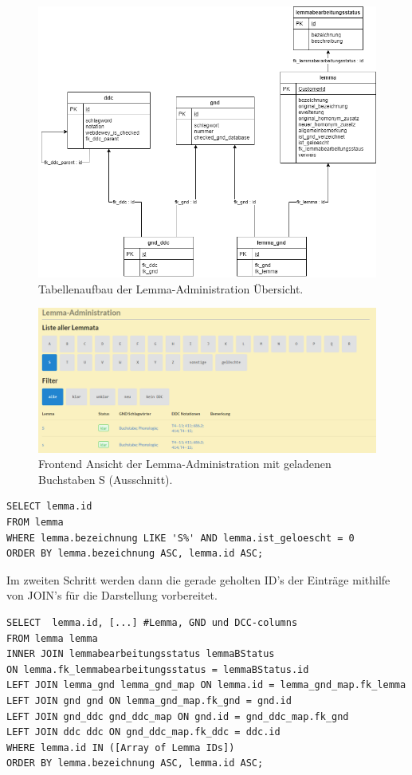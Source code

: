 \begin{figure}
	\centering
	\includegraphics[width=0.8\linewidth]{images/structure_lemmaadministration.png}
	\caption{Tabellenaufbau der Lemma-Administration Übersicht.}
	\label{img:lAdminStructure}
\end{figure}

\begin{figure}
	\centering
	\includegraphics[width=1\linewidth]{images/lemmaadministration_sample.PNG}
	\caption{Frontend Ansicht der Lemma-Administration mit geladenen Buchstaben S (Ausschnitt).}
	\label{img:lAdminSample}
\end{figure}

\lstset{language=SQL}
\begin{lstlisting}[frame=single] 
SELECT lemma.id
FROM lemma
WHERE lemma.bezeichnung LIKE 'S%' AND lemma.ist_geloescht = 0
ORDER BY lemma.bezeichnung ASC, lemma.id ASC;
\end{lstlisting}

Im zweiten Schritt werden dann die gerade geholten ID's der Einträge mithilfe von JOIN’s für die Darstellung vorbereitet.

\lstset{language=SQL}
\begin{lstlisting}[frame=single, label={lst:sqlQuery}] 
SELECT  lemma.id, [...] #Lemma, GND und DCC-columns        
FROM lemma lemma
INNER JOIN lemmabearbeitungsstatus lemmaBStatus
ON lemma.fk_lemmabearbeitungsstatus = lemmaBStatus.id
LEFT JOIN lemma_gnd lemma_gnd_map ON lemma.id = lemma_gnd_map.fk_lemma
LEFT JOIN gnd gnd ON lemma_gnd_map.fk_gnd = gnd.id
LEFT JOIN gnd_ddc gnd_ddc_map ON gnd.id = gnd_ddc_map.fk_gnd
LEFT JOIN ddc ddc ON gnd_ddc_map.fk_ddc = ddc.id
WHERE lemma.id IN ([Array of Lemma IDs])
ORDER BY lemma.bezeichnung ASC, lemma.id ASC;

\end{lstlisting}